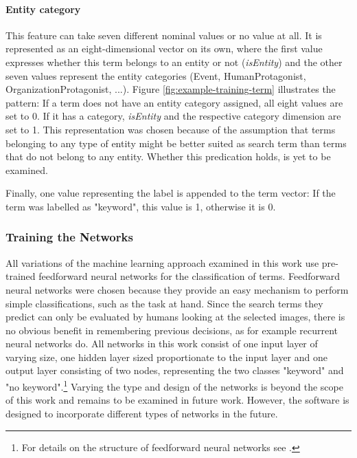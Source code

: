 \documentclass[11pt,a4paper,twoside]{article}
\begin{document}
\paragraph{Entity category} This feature can take seven different nominal values or no value at all. It is represented as an eight-dimensional vector on its own, where the first value expresses whether this term belongs to an entity or not (\emph{isEntity}) and the other seven values represent the entity categories (Event, HumanProtagonist, OrganizationProtagonist, ...). Figure \ref{fig:example-training-term} illustrates the pattern: If a term does not have an entity category assigned, all eight values are set to 0. If it has a category, \emph{isEntity} and the respective category dimension are set to 1. This representation was chosen because of the assumption that terms belonging to any type of entity might be better suited as search term than terms that do not belong to any entity. Whether this predication holds, is yet to be examined. 

\bigskip

\noindent Finally, one value representing the label is appended to the term vector: If the term was labelled as "keyword", this value is 1, otherwise it is 0.

\subsubsection{Training the Networks} \label{SystemTrainTrain}

\noindent All variations of the machine learning approach examined in this work use pre-trained feedforward neural networks for the classification of terms. Feedforward neural networks were chosen because they provide an easy mechanism to perform simple classifications, such as the task at hand. Since the search terms they predict can only be evaluated by humans looking at the selected images, there is no obvious benefit in remembering previous decisions, as for example recurrent neural networks do. All networks in this work consist of one input layer of varying size, one hidden layer sized proportionate to the input layer and one output layer consisting of two nodes, representing the two classes "keyword" and "no keyword".\footnote{For details on the structure of feedforward neural networks see \cite{Bishop1995NeuralRecognition}.} Varying the type and design of the networks is beyond the scope of this work and remains to be examined in future work. However, the software is designed to incorporate different types of networks in the future.
\end{document}
